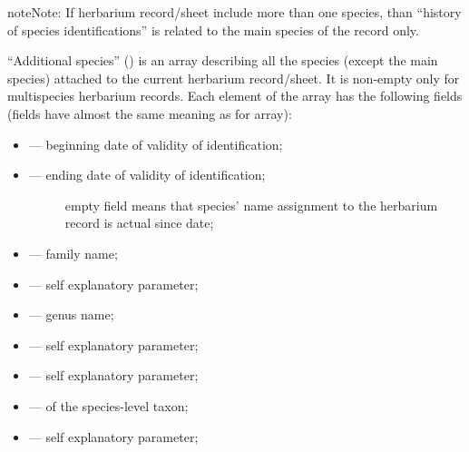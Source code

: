 \documentclass[letterpaper,10pt,english]{sphinxmanual}
\begin{document}
\begin{sphinxadmonition}{note}{Note:}
If herbarium record/sheet include more than one species,
than “history of species identifications” is related to the main
species of the record only.
\end{sphinxadmonition}


“Additional species” () is an array describing all the species
(except the main species) attached to the current herbarium record/sheet.
It is non-empty only for multispecies herbarium records.
Each element of the  array has the following fields
(fields have almost the same meaning as for  array):
\begin{itemize}
\item {} 
 — beginning date of validity of identification;

\item {} \begin{description}
\item[{ — ending date of validity of identification;}] \leavevmode
empty field means that species’ name assignment to the herbarium record is actual since  date;

\end{description}

\item {} 
 — family name;

\item {} 
 — self explanatory parameter;

\item {} 
 — genus name;

\item {} 
 — self explanatory parameter;

\item {} 
 — self explanatory parameter;

\item {} 
 —  of the species-level taxon;

\item {} 
 — self explanatory parameter;


\end{itemize}
\end{document}
